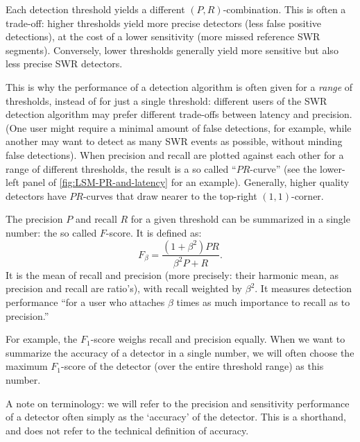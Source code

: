 Each detection threshold yields a different $(P, R)$-combination. This is often a trade-off: higher thresholds yield more precise detectors (less false positive detections), at the cost of a lower sensitivity (more missed reference SWR segments). Conversely, lower thresholds generally yield more sensitive but also less precise SWR detectors.

This is why the performance of a detection algorithm is often given for a \emph{range} of thresholds, instead of for just a single threshold: different users of the SWR detection algorithm may prefer different trade-offs between latency and precision. (One user might require a minimal amount of false detections, for example, while another may want to detect as many SWR events as possible, without minding false detections). When precision and recall are plotted against each other for a range of different thresholds, the result is a so called ``$PR$-curve'' (see the lower-left panel of \cref{fig:LSM-PR-and-latency} for an example). Generally, higher quality detectors have $PR$-curves that draw nearer to the top-right $(1, 1)$-corner.

The precision $P$ and recall $R$ for a given threshold can be summarized in a single number: the so called $F$-score. It is defined as:
\begin{equation}
F_\beta = \frac{(1+\beta^2) P R}{\beta^2 P + R}.
\end{equation}
It is the mean of recall and precision (more precisely: their harmonic mean, as precision and recall are ratio's), with recall weighted by $\beta^2$. It measures detection performance ``for a user who attaches $\beta$ times as much importance to recall as to precision.'' \cite{Rijsbergen1979}

For example, the $F_1$-score weighs recall and precision equally. When we want to summarize the accuracy of a detector in a single number, we will often choose the maximum $F_1$-score of the detector (over the entire threshold range) as this number.

A note on terminology: we will refer to the precision and sensitivity performance of a detector often simply as the `accuracy' of the detector. This is a shorthand, and does not refer to the technical definition of accuracy.\footnotemark{}





